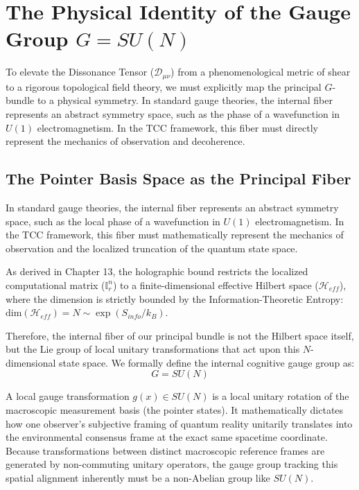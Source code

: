\documentclass[12pt,openany]{book}
\theoremstyle{plain}
\theoremstyle{definition}
\theoremstyle{remark}
\begin{document}
\section{The Physical Identity of the Gauge Group $G = SU(N)$}

To elevate the Dissonance Tensor ($\mathcal{D}_{\mu\nu}$) from a phenomenological metric of shear to a rigorous topological field theory, we must explicitly map the principal $G$-bundle to a physical symmetry. In standard gauge theories, the internal fiber represents an abstract symmetry space, such as the phase of a wavefunction in $U(1)$ electromagnetism. In the TCC framework, this fiber must directly represent the mechanics of observation and decoherence.

\subsection{The Pointer Basis Space as the Principal Fiber}

In standard gauge theories, the internal fiber represents an abstract symmetry space, such as the local phase of a wavefunction in $U(1)$ electromagnetism. In the TCC framework, this fiber must mathematically represent the mechanics of observation and the localized truncation of the quantum state space.

As derived in Chapter 13, the holographic bound restricts the localized computational matrix ($\mathbb{I}_r^n$) to a finite-dimensional effective Hilbert space ($\mathcal{H}_{eff}$), where the dimension is strictly bounded by the Information-Theoretic Entropy: $\text{dim}(\mathcal{H}_{eff}) = N \sim \exp(S_{info}/k_B)$.

Therefore, the internal fiber of our principal bundle is not the Hilbert space itself, but the Lie group of local unitary transformations that act upon this $N$-dimensional state space. We formally define the internal cognitive gauge group as:$$G = SU(N)$$

A local gauge transformation $g(x) \in SU(N)$ is a local unitary rotation of the macroscopic measurement basis (the pointer states). It mathematically dictates how one observer's subjective framing of quantum reality unitarily translates into the environmental consensus frame at the exact same spacetime coordinate. Because transformations between distinct macroscopic reference frames are generated by non-commuting unitary operators, the gauge group tracking this spatial alignment inherently must be a non-Abelian group like $SU(N)$.
\end{document}
